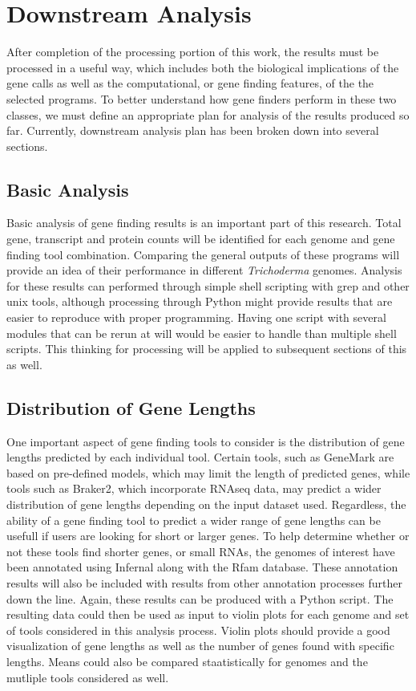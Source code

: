 \documentclass[12pt]{article}
\begin{document}
\section{Downstream Analysis}

After completion of the processing portion of this work, the results
must be processed in a useful way, which includes both the biological
implications of the gene calls as well as the computational, or gene
finding features, of the the selected programs. To better understand
how gene finders perform in these two classes, we must define an
appropriate plan for analysis of the results produced so
far. Currently, downstream analysis plan has been broken down into
several sections.

\subsection{Basic Analysis}

Basic analysis of gene finding results is an important part of this
research. Total gene, transcript and protein counts will be identified
for each genome and gene finding tool combination. Comparing the
general outputs of these programs will provide an idea of their
performance in different \textit{Trichoderma} genomes. Analysis for
these results can performed through simple shell scripting with grep
and other unix tools, although processing through Python might provide
results that are easier to reproduce with proper programming. Having
one script with several modules that can be rerun at will would be
easier to handle than multiple shell scripts. This thinking for
processing will be applied to subsequent sections of this as well. 

\subsection{Distribution of Gene Lengths}

One important aspect of gene finding tools to consider is the
distribution of gene lengths predicted by each individual
tool. Certain tools, such as GeneMark are based on pre-defined models,
which may limit the length of predicted genes, while tools such as
Braker2, which incorporate RNAseq data, may predict a wider
distribution of gene lengths depending on the input dataset
used. Regardless, the ability of a gene finding tool to predict a
wider range of gene lengths can be usefull if users are looking for
short or larger genes. To help determine whether or not these tools
find shorter genes, or small RNAs, the genomes of interest have been
annotated using Infernal along with the Rfam database. These
annotation results will also be included with results from other
annotation processes further down the line. Again, these results can
be produced with a Python script. The resulting data could then be
used as input to violin plots for each genome and set of tools
considered in this analysis process. Violin plots should provide a
good visualization of gene lengths as well as the number of genes
found with specific lengths. Means could also be compared
staatistically for genomes and the mutliple tools considered as well.
\end{document}
